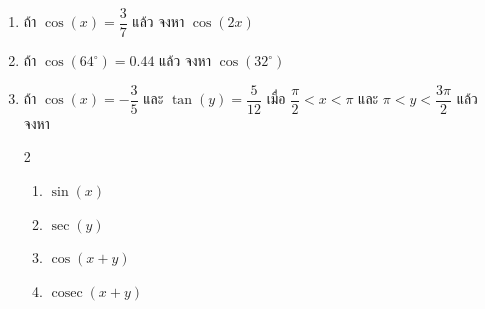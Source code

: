 \begin{enumerate}[label=\arabic*., leftmargin=*, itemsep=1em]
	\item ถ้า $\cos \left( x \right) = \dfrac{3}{7}$ แล้ว จงหา $\cos \left( 2x \right)$
	
	\item ถ้า $\cos \left( 64^{\circ} \right) = 0.44$ แล้ว จงหา $\cos \left( 32^{\circ} \right)$
	
	\item ถ้า $\cos \left( x \right) = -\dfrac{3}{5}$ และ $\tan \left( y \right) = \dfrac{5}{12}$ เมื่อ $\dfrac{\pi}{2} < x < \pi$ และ $\pi < y < \dfrac{3\pi}{2}$ แล้ว จงหา
	\begin{multicols}{2}
		\begin{enumerate}[label=\theenumi\arabic*), leftmargin=1.5em, itemsep=0.6em]
			\everymath{\displaystyle}
			\item $\sin \left( x \right)$
			\item $\sec \left( y \right)$
			\item $\cos \left( x + y \right)$
			\item $\operatorname{cosec} \left( x + y \right)$
		\end{enumerate}
	\end{multicols}
	

\end{enumerate}
